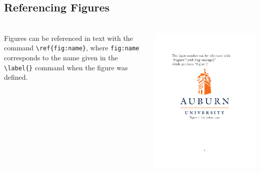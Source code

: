 \documentclass[article]{beamer}
\begin{document}
\subsection{Referencing Figures}
\begin{frame}
  \frametitle{\thesubsection}
  \framesubtitle{}
  \begin{columns}
    \begin{column}{0.5\textwidth}
      Figures can be referenced in text with the command
      \texttt{\textbackslash ref\{fig:name\}}, where \texttt{fig:name}
      corresponds to the name given in the \texttt{\textbackslash label\{\}}
      command when the figure was defined.
    \end{column}
    \begin{column}{0.5\textwidth}
      \colorbox{white}{\includegraphics[height=0.9\textheight]{figure_reference_example.pdf}}
    \end{column}
  \end{columns}
\end{frame}
\end{document}
